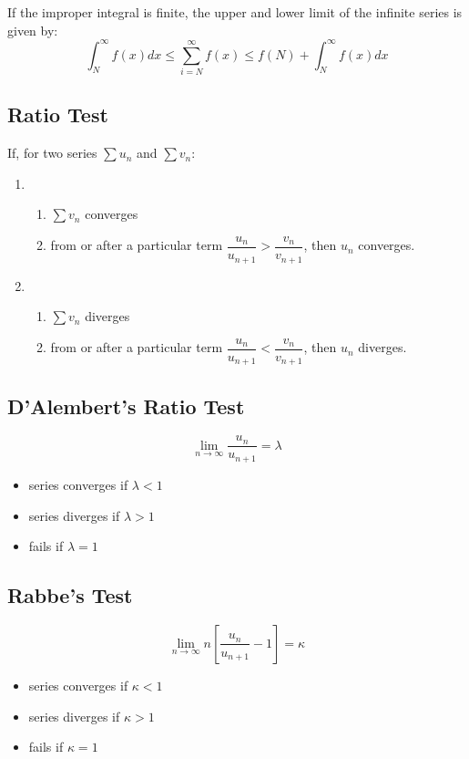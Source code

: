 If the improper integral is finite, the upper and lower limit of the infinite series is given by:
\begin{equation}
	\int_{N}^{\infty} f(x) dx \leq \sum_{i=N}^{\infty} f(x) \leq f(N)+\int_{N}^{\infty} f(x) dx
\end{equation}

\subsection{Ratio Test}
If, for two series $\sum u_n$ and $\sum v_n$:
\begin{enumerate}
	\item \begin{enumerate}
		\item $\sum v_n$ converges
		\item from or after a particular term $\dfrac{u_n}{u_{n+1}}>\dfrac{v_n}{v_{n+1}}$, then $u_n$ converges.
	\end{enumerate}
	\item \begin{enumerate}
		\item $\sum v_n$ diverges
		\item from or after a particular term $\dfrac{u_n}{u_{n+1}}<\dfrac{v_n}{v_{n+1}}$, then $u_n$ diverges.
	\end{enumerate}
\end{enumerate}

\subsection{D'Alembert's Ratio Test}
\begin{equation}
	\lim_{n\to\infty} \dfrac{u_n}{u_{n+1}}=\lambda
\end{equation}
\begin{itemize}
	\item series converges if $\lambda<1$
	\item series diverges if $\lambda>1$
	\item fails if $\lambda=1$
\end{itemize}

\subsection{Rabbe's Test}
\begin{equation}
	\lim_{n\to\infty} n[\dfrac{u_n}{u_{n+1}}-1]=\kappa
\end{equation}
\begin{itemize}
	\item series converges if $\kappa<1$
	\item series diverges if $\kappa>1$
	\item fails if $\kappa=1$
\end{itemize}

